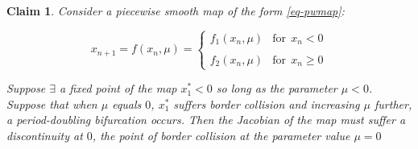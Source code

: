 \documentclass{book}
\renewcommand{\(}{\begin{columns}}
\renewcommand{\)}{\end{columns}}
\newcommand{\<}[1]{\begin{column}{#1}}
\renewcommand{\>}{\end{column}}
\newtheorem{claim}{Claim}[section]
\begin{document}
\begin{claim}
\label{claim-jacob-disc}
Consider a piecewise smooth map of the form \eqref{eq-pwmap}:

\begin{equation}
x_{n+1}=f(x_n,\mu)=\begin{cases} f_1(x_n,\mu) & \mathrm{for}~~ x_n < 0 \\ \\
f_2(x_n,\mu)&\mathrm{for}~~ x_n\geq 0 \end{cases}
\end{equation}

Suppose $\exists$ a fixed point of the map $x_1^*<0$ so long as  the parameter $\mu<0$.  
Suppose that when $\mu$ equals $0$, $x_1^*$ suffers border collision and 
increasing $\mu$ further, a period-doubling bifurcation occurs.  Then the Jacobian 
of the map must suffer a discontinuity at $0$, the point of border collision 
at the parameter value $\mu=0$
\end{claim}
\end{document}
